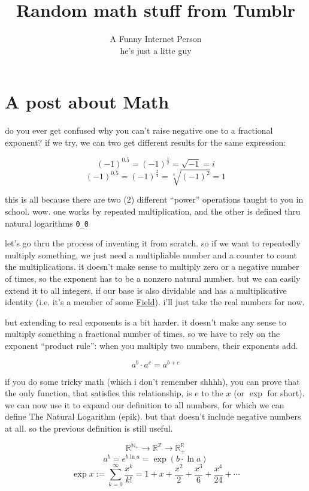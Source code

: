 \documentclass{article}
\title{Random math stuff from Tumblr}
\author{A Funny Internet Person \\ {\small he's just a litte guy}}
\begin{document}
  \maketitle

  \section{A post about Math}

  do you ever get confused why you can't raise negative one to a fractional exponent?
  if we try, we can two get different results for the same expression:

  \[
    (-1)^{0.5} = (-1)^\frac{1}{2} = \sqrt{-1} = i
  \]
  \[
    (-1)^{0.5} = (-1)^\frac{2}{4} = \sqrt[4]{(-1)^2} = 1
  \]

  this is all because there are two (2) different ``power'' operations taught to you in school.
  wow. one works by repeated multiplication, and the other is defined thru natural logarithms \texttt{0\_0}

  let's go thru the process of inventing it from scratch. so if we want to repeatedly multiply something, we just need a multipliable number and a counter to count the multiplications. it doesn't make sense to multiply zero or a negative number of times, so the exponent has to be a nonzero natural number. but we can easily extend it to all integers, if our base is also dividable and has a multiplicative identity (i.e. it's a member of some \href{https://en.wikipedia.org/wiki/Field_(mathematics)}{Field}). i'll just take the real numbers for now.

  but extending to real exponents is a bit harder. it doesn't make any sense to multiply something a fractional number of times. so we have to rely on the exponent ``product rule'': when you multiply two numbers, their exponents add.

  \[
    a^b \cdot a^c = a^{b+c}
  \]

  if you do some tricky math (which i don't remember shhhh), you can prove that the only function, that satisfies this relationship, is $e$ to the $x$ (or $\exp$ for short). we can now use it to expand our definition to all numbers, for which we can define The Natural Logarithm (epik). but that doesn't include negative numbers at all. so the previous definition is still useful.

  \[
    \mathbb{R}^{\mathbb{N_+}} \to \mathbb{R}^{\mathbb{Z}} \to \mathbb{R}^{\mathbb{R}}_+
  \]
  \[
    a^b = e^{b\ln a} = \exp(b\cdot \ln a)
  \]
  \[
    \exp x := \sum_{k = 0}^{\infty} \frac{x^k}{k!} = 1 + x + \frac{x^2}{2} + \frac{x^3}{6} + \frac{x^4}{24} + \cdots
  \]
\end{document}
